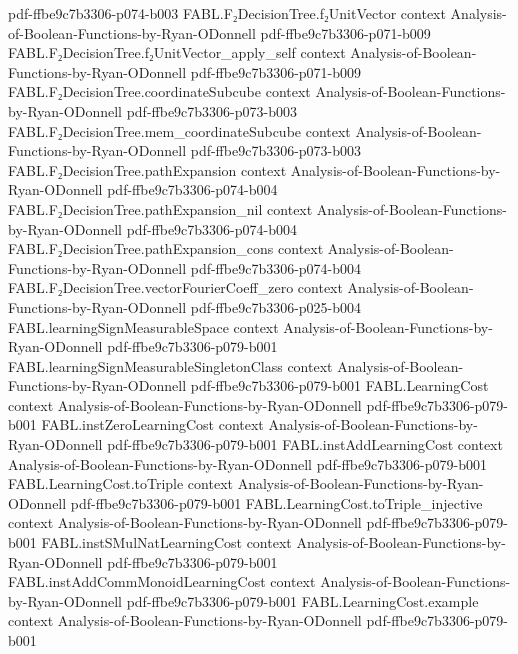 \begin{theorem}
  {pdf-ffbe9c7b3306-p074-b003}
\proofstep
  {FABL.F₂DecisionTree.f₂UnitVector}
  {context}
  {Analysis-of-Boolean-Functions-by-Ryan-ODonnell}
  {pdf-ffbe9c7b3306-p071-b009}
\proofstep
  {FABL.F₂DecisionTree.f₂UnitVector_apply_self}
  {context}
  {Analysis-of-Boolean-Functions-by-Ryan-ODonnell}
  {pdf-ffbe9c7b3306-p071-b009}
\proofstep
  {FABL.F₂DecisionTree.coordinateSubcube}
  {context}
  {Analysis-of-Boolean-Functions-by-Ryan-ODonnell}
  {pdf-ffbe9c7b3306-p073-b003}
\proofstep
  {FABL.F₂DecisionTree.mem_coordinateSubcube}
  {context}
  {Analysis-of-Boolean-Functions-by-Ryan-ODonnell}
  {pdf-ffbe9c7b3306-p073-b003}
\proofstep
  {FABL.F₂DecisionTree.pathExpansion}
  {context}
  {Analysis-of-Boolean-Functions-by-Ryan-ODonnell}
  {pdf-ffbe9c7b3306-p074-b004}
\proofstep
  {FABL.F₂DecisionTree.pathExpansion_nil}
  {context}
  {Analysis-of-Boolean-Functions-by-Ryan-ODonnell}
  {pdf-ffbe9c7b3306-p074-b004}
\proofstep
  {FABL.F₂DecisionTree.pathExpansion_cons}
  {context}
  {Analysis-of-Boolean-Functions-by-Ryan-ODonnell}
  {pdf-ffbe9c7b3306-p074-b004}
\proofstep
  {FABL.F₂DecisionTree.vectorFourierCoeff_zero}
  {context}
  {Analysis-of-Boolean-Functions-by-Ryan-ODonnell}
  {pdf-ffbe9c7b3306-p025-b004}
\proofstep
  {FABL.learningSignMeasurableSpace}
  {context}
  {Analysis-of-Boolean-Functions-by-Ryan-ODonnell}
  {pdf-ffbe9c7b3306-p079-b001}
\proofstep
  {FABL.learningSignMeasurableSingletonClass}
  {context}
  {Analysis-of-Boolean-Functions-by-Ryan-ODonnell}
  {pdf-ffbe9c7b3306-p079-b001}
\proofstep
  {FABL.LearningCost}
  {context}
  {Analysis-of-Boolean-Functions-by-Ryan-ODonnell}
  {pdf-ffbe9c7b3306-p079-b001}
\proofstep
  {FABL.instZeroLearningCost}
  {context}
  {Analysis-of-Boolean-Functions-by-Ryan-ODonnell}
  {pdf-ffbe9c7b3306-p079-b001}
\proofstep
  {FABL.instAddLearningCost}
  {context}
  {Analysis-of-Boolean-Functions-by-Ryan-ODonnell}
  {pdf-ffbe9c7b3306-p079-b001}
\proofstep
  {FABL.LearningCost.toTriple}
  {context}
  {Analysis-of-Boolean-Functions-by-Ryan-ODonnell}
  {pdf-ffbe9c7b3306-p079-b001}
\proofstep
  {FABL.LearningCost.toTriple_injective}
  {context}
  {Analysis-of-Boolean-Functions-by-Ryan-ODonnell}
  {pdf-ffbe9c7b3306-p079-b001}
\proofstep
  {FABL.instSMulNatLearningCost}
  {context}
  {Analysis-of-Boolean-Functions-by-Ryan-ODonnell}
  {pdf-ffbe9c7b3306-p079-b001}
\proofstep
  {FABL.instAddCommMonoidLearningCost}
  {context}
  {Analysis-of-Boolean-Functions-by-Ryan-ODonnell}
  {pdf-ffbe9c7b3306-p079-b001}
\proofstep
  {FABL.LearningCost.example}
  {context}
  {Analysis-of-Boolean-Functions-by-Ryan-ODonnell}
  {pdf-ffbe9c7b3306-p079-b001}

\end{theorem}
